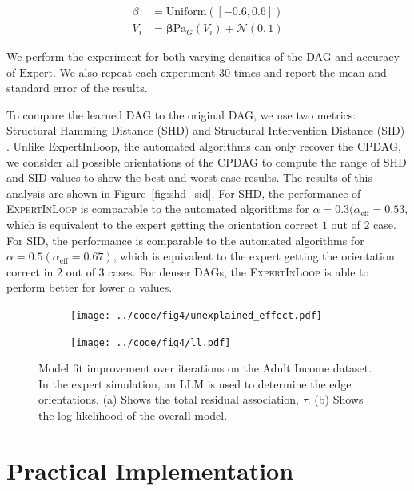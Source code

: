 \documentclass{uai2025} %
\begin{document}
\begin{equation}
	\begin{split}
		\beta &= \mathrm{Uniform}([-0.6, 0.6]) \\
		V_i &= \bm{\beta} \mathrm{Pa}_G(V_i) + \mathcal{N}(0, 1)
	\end{split}
\end{equation}

We perform the experiment for both varying densities of the DAG and accuracy of
$\mathrm{Expert}$. We also repeat each experiment $ 30 $ times and report the
mean and standard error of the results.

To compare the learned DAG to the original DAG, we use two metrics: Structural
Hamming Distance (SHD) and Structural Intervention Distance (SID)
\citep{Peters2015}. Unlike \textrm{ExpertInLoop}, the automated algorithms can
only recover the CPDAG, we consider all possible orientations of the CPDAG to
compute the range of SHD and SID values to show the best and worst case
results. The results of this analysis are shown in Figure~\ref{fig:shd_sid}.
For SHD, the performance of \textsc{ExpertInLoop} is comparable to the
automated algorithms for $ \alpha = 0.3 (\alpha_{\textrm{eff}} = 0.53 $, which
is equivalent to the expert getting the orientation correct $ 1 $ out of $ 2 $
case. For SID, the performance is comparable to the automated algorithms for $
\alpha = 0.5 (\alpha_{\textrm{eff}} = 0.67) $, which is equivalent to the
expert getting the orientation correct in $ 2 $ out of $ 3 $ cases. For denser
DAGs, the \textsc{ExpertInLoop} is able to perform better for lower $ \alpha $
values.


\begin{figure}[t!]
	\begin{subfigure}{0.25\textwidth}
		\centering
		\texttt{[image: ../code/fig4/unexplained\_effect.pdf]}
		\caption{}
	\end{subfigure}%
	\begin{subfigure}{0.25\textwidth}
		\centering
		\texttt{[image: ../code/fig4/ll.pdf]}
		\caption{}
	\end{subfigure}
	\caption{Model fit improvement over iterations on the Adult Income dataset. In the expert simulation, an 
		LLM is used to determine the edge orientations. (a) Shows the total residual association, $\tau$. 
		(b) Shows the log-likelihood of the overall model.
	}
	\label{fig:unexplained_ll}
\end{figure}

\section{Practical Implementation}
\end{document}
